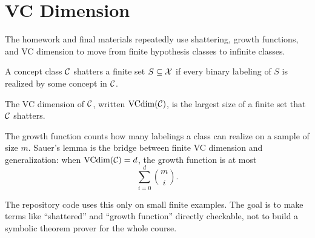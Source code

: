 \section{VC Dimension}

The homework and final materials repeatedly use shattering, growth functions,
and VC dimension to move from finite hypothesis classes to infinite classes.

\begin{definition}[Shattering]
A concept class $\mathcal{C}$ shatters a finite set $S \subseteq \mathcal{X}$ if every binary
labeling of $S$ is realized by some concept in $\mathcal{C}$.
\end{definition}

\begin{definition}[VC dimension]
The VC dimension of $\mathcal{C}$, written $\operatorname{VCdim}(\mathcal{C})$, is the largest size of a finite set
that $\mathcal{C}$ shatters.
\end{definition}

The growth function counts how many labelings a class can realize on a sample
of size $m$. Sauer's lemma is the bridge between finite VC dimension and
generalization: when $\operatorname{VCdim}(\mathcal{C})=d$, the growth function is at most
\[
  \sum_{i=0}^{d} \binom{m}{i}.
\]

The repository code uses this only on small finite examples. The goal is to make
terms like ``shattered'' and ``growth function'' directly checkable, not to
build a symbolic theorem prover for the whole course.
